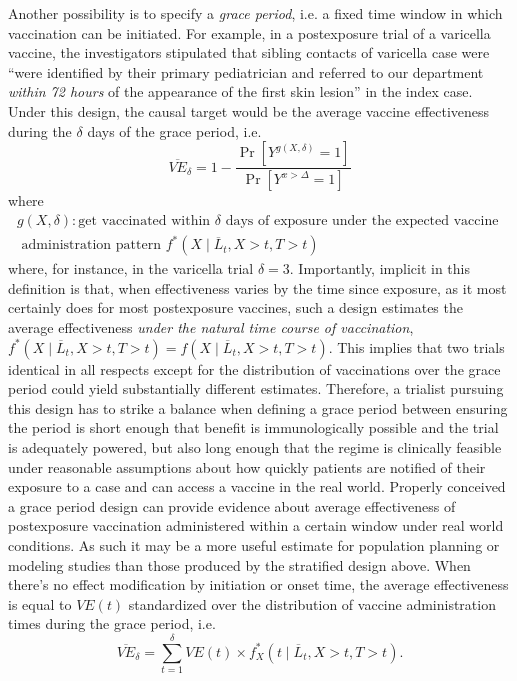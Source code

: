 \documentclass[11pt]{article}
\begin{document}
\begin{appendix}
Another possibility is to specify a \textit{grace period}, i.e. a fixed time window in which vaccination can be initiated. For example, in a postexposure trial of a varicella vaccine, the investigators stipulated that sibling contacts of varicella case were ``were identified by their primary pediatrician and referred to our department \textit{within 72 hours} of the appearance of the first skin lesion'' in the index case. Under this design, the causal target would be the average vaccine effectiveness during the $\delta$ days of the grace period, i.e.
$$
\overline{VE}_\delta = 1 - \frac{\Pr[Y^{g(X,\delta)} = 1]}{\Pr[Y^{x > \Delta} = 1]}
$$ 
where
\begin{gather*}
    g(X,\delta): \text{get vaccinated within $\delta$ days of exposure under the expected vaccine } \\ \text{ administration pattern }  f^*(X \mid \overline{L}_t, X > t, T > t)
\end{gather*}
where, for instance, in the varicella trial $\delta = 3$. Importantly, implicit in this definition is that, when effectiveness varies by the time since exposure, as it most certainly does for most postexposure vaccines, such a design estimates the average effectiveness \textit{under the natural time course of vaccination}, $f^*(X \mid \overline{L}_t, X > t, T > t) = f(X \mid \overline{L}_t, X > t, T > t)$. This implies that two trials identical in all respects except for the distribution of vaccinations over the grace period could yield substantially different estimates. Therefore, a trialist pursuing this design has to strike a balance when defining a grace period between ensuring the period is short enough that benefit is immunologically possible and the trial is adequately powered, but also long enough that the regime is clinically feasible under reasonable assumptions about how quickly patients are notified of their exposure to a case and can access a vaccine in the real world. Properly conceived a grace period design can provide evidence about average effectiveness of postexposure vaccination administered within a certain window under real world conditions. As such it may be a more useful estimate for population planning or modeling studies than those produced by the stratified design above. When there's no effect modification by initiation or onset time, the average effectiveness is equal to $VE(t)$ standardized over the distribution of vaccine administration times during the grace period, i.e.
$$\overline{VE}_\delta = \sum_{t = 1}^\delta VE(t) \times f^*_X(t \mid \overline{L}_t, X > t, T > t).$$


\end{appendix}
\end{document}
